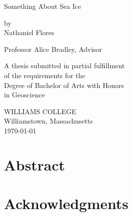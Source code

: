 \documentclass[12pt, oneside]{book}
\begin{document}
\begin{titlepage}
\begin{center}

\vspace*{2cm}

{\huge Something About Sea Ice} %

\vspace{2cm}

{\large by\\Nathaniel Flores}

\vspace{2cm}
{Professor Alice Bradley, Advisor}

\vfill

A thesis submitted in partial fulfillment\\
of the requirements for the\\
Degree of Bachelor of Arts with Honors\\
in Geoscience

\vspace*{3cm}

WILLIAMS COLLEGE\\
Williamstown, Massachusetts\\
\today %
\end{center}
\end{titlepage}


\frontmatter 


\onehalfspacing

\chapter{Abstract}


\chapter{Acknowledgments}

\end{document}
